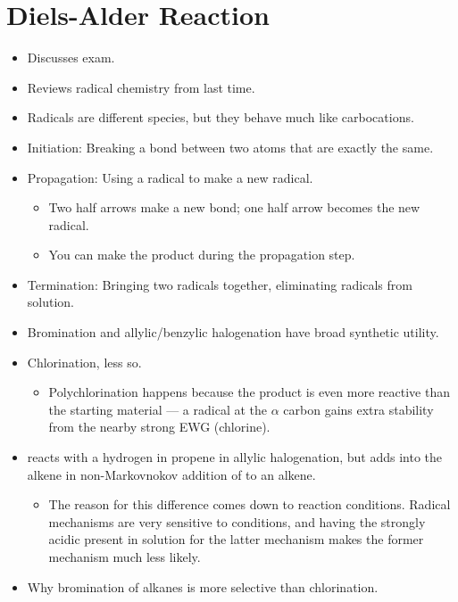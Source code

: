 \documentclass[../notes.tex]{subfiles}
\begin{document}
\section{Diels-Alder Reaction}
\begin{itemize}
    \item {}Discusses exam.
    \item Reviews radical chemistry from last time.
    \item Radicals are different species, but they behave much like carbocations.
    \item Initiation: Breaking a bond between two atoms that are exactly the same.
    \item Propagation: Using a radical to make a new radical.
    \begin{itemize}
        \item Two half arrows make a new bond; one half arrow becomes the new radical.
        \item You can make the product during the propagation step.
    \end{itemize}
    \item Termination: Bringing two radicals together, eliminating radicals from solution.
    \item Bromination and allylic/benzylic halogenation have broad synthetic utility.
    \item Chlorination, less so.
    \begin{itemize}
        \item Polychlorination happens because the product is even more reactive than the starting material --- a radical at the $\alpha$ carbon gains extra stability from the nearby strong EWG (chlorine).
    \end{itemize}
    \item {} reacts with a hydrogen in propene in allylic halogenation, but adds into the alkene in non-Markovnokov addition of  to an alkene.
    \begin{itemize}
        \item The reason for this difference comes down to reaction conditions. Radical mechanisms are very sensitive to conditions, and having the strongly acidic  present in solution for the latter mechanism makes the former mechanism much less likely.
    \end{itemize}
    \item Why bromination of alkanes is more selective than chlorination.
    \begin{itemize}

\end{itemize}
\end{itemize}
\end{document}
